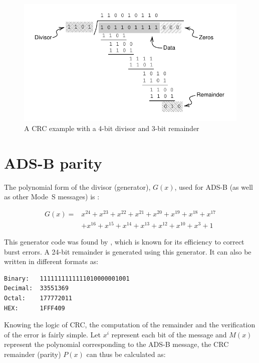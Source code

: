 \begin{figure}[ht]
  \includegraphics[scale=0.9]{figures/crc/crc_example.pdf}
  \caption{A CRC example with a 4-bit divisor and 3-bit remainder}
  \label{fig:crc_example}
\end{figure}


\section{ADS-B parity}

The polynomial form of the divisor (generator), $G(x)$, used for ADS-B (as well as other Mode~S messages) is \cite{gertz1984}:

\begin{equation}
  \begin{split}
  G(x) = &x^{24}+x^{23}+x^{22}+x^{21}+x^{20}+x^{19}+x^{18}+x^{17} \\
         &+x^{16}+x^{15}+x^{14}+x^{13}+x^{12}+x^{10}+x^{3}+1
  \end{split}
\end{equation}

This generator code was found by \cite{kasami1964}, which is known for its efficiency to correct burst errors. A 24-bit remainder is generated using this generator. It can also be written in different formats as:

\begin{verbatim}
Binary:   1111111111111010000001001
Decimal:  33551369
Octal:    177772011
HEX:      1FFF409
\end{verbatim}

Knowing the logic of CRC, the computation of the remainder and the verification of the error is fairly simple. Let  $x^{i}$ represent each bit of the message and $M(x)$ represent the polynomial corresponding to the ADS-B message, the CRC remainder (parity) $P(x)$ can thus be calculated as:

